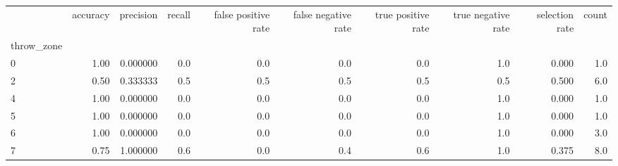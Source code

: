 \begin{tabular}{lrrrrrrrrr}
\toprule
{} &  accuracy &  precision &  recall &  false positive rate &  false negative rate &  true positive rate &  true negative rate &  selection rate &  count \\
throw\_zone &           &            &         &                      &                      &                     &                     &                 &        \\
\midrule
0          &      1.00 &   0.000000 &     0.0 &                  0.0 &                  0.0 &                 0.0 &                 1.0 &           0.000 &    1.0 \\
2          &      0.50 &   0.333333 &     0.5 &                  0.5 &                  0.5 &                 0.5 &                 0.5 &           0.500 &    6.0 \\
4          &      1.00 &   0.000000 &     0.0 &                  0.0 &                  0.0 &                 0.0 &                 1.0 &           0.000 &    1.0 \\
5          &      1.00 &   0.000000 &     0.0 &                  0.0 &                  0.0 &                 0.0 &                 1.0 &           0.000 &    1.0 \\
6          &      1.00 &   0.000000 &     0.0 &                  0.0 &                  0.0 &                 0.0 &                 1.0 &           0.000 &    3.0 \\
7          &      0.75 &   1.000000 &     0.6 &                  0.0 &                  0.4 &                 0.6 &                 1.0 &           0.375 &    8.0 \\
\bottomrule
\end{tabular}

